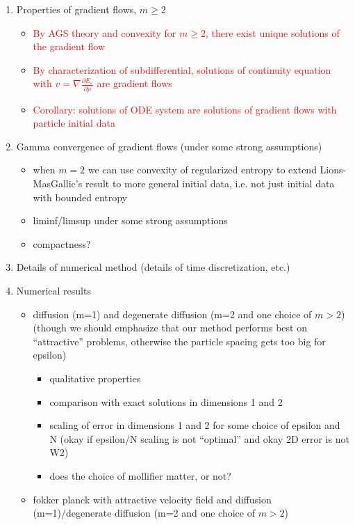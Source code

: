 \documentclass[11pt,leqno]{amsart}
\theoremstyle{definition}
\newcommand{\grad}{\nabla}
\def\e{\varepsilon}
\begin{document}
\begin{enumerate}[1)]
\begin{itemize}
\end{itemize}
\item Properties of gradient flows, $m \geq 2$
\begin{itemize}
\item \textcolor{red}{By AGS theory and convexity for $m \geq 2$, there exist unique solutions of the gradient flow}
\item \textcolor{red}{By characterization of subdifferential, solutions of continuity equation with $v = \grad \frac{\partial E_\e}{\partial \rho}$ are gradient flows}
\item \textcolor{red}{Corollary: solutions of ODE system are solutions of gradient flows with particle initial data}
\end{itemize}
\item {\color{blue} Gamma convergence of gradient flows (under some strong assumptions)}
\begin{itemize}
\item {\color{red} when $m=2$ we can use convexity of regularized entropy to extend Lions-MasGallic's result to more general initial data, i.e. not just initial data with bounded entropy}
\item {\color{blue} liminf/limsup under some strong assumptions}
\item {\color{blue} compactness?}
\end{itemize}
\item Details of numerical method (details of time discretization, etc.)
\item Numerical results
\begin{itemize}
\item diffusion (m=1) and degenerate diffusion (m=2 and one choice of $m>2$) (though we should emphasize that our method performs best on ``attractive'' problems, otherwise the particle spacing gets too big for epsilon)
\begin{itemize}
\item qualitative properties
\item comparison with exact solutions in dimensions 1 and 2
\item scaling of error in dimensions 1 and 2 for some choice of epsilon and N (okay if epsilon/N scaling is not ``optimal'' and okay 2D error is not W2)
\item does the choice of mollifier matter, or not?
\end{itemize}
\item fokker planck with attractive velocity field and diffusion (m=1)/degenerate diffusion (m=2 and one choice of $m>2$)

\end{itemize}
\end{enumerate}
\end{document}
